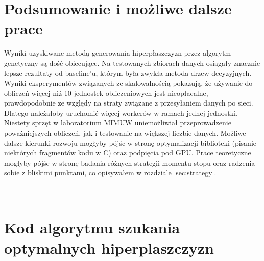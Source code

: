 \documentclass[magisterska]{pracamgr}
\theoremstyle{plain}
\theoremstyle{definition}
\theoremstyle{remark}
\begin{document}
\section{Podsumowanie i możliwe dalsze prace}
Wyniki uzyskiwane metodą generowania hiperpłaszczyzn przez algorytm genetyczny są dość obiecujące. 
Na testowanych zbiorach danych osiagały znacznie lepsze rezultaty od baseline'u, którym była zwykła metoda drzew decyzyjnych.
Wyniki eksperymentów związanych ze skalowalnością pokazują, że używanie do obliczeń więcej niż 10 jednostek obliczeniowych jest
nieopłacalne, prawdopodobnie ze względy na straty związane z przesyłaniem danych po sieci. Dlatego należałoby uruchomić więcej
workerów w ramach jednej jednostki. Niestety sprzęt w laboratorium MIMUW uniemożliwiał przeprowadzenie poważniejszych obliczeń,
jak i testowanie na większej liczbie danych.
Możliwe dalsze kierunki rozwoju mogłyby pójśc w stronę optymalizacji biblioteki (pisanie niektórych fragmentów kodu w C)
oraz podpięcia pod GPU. Prace teoretyczne mogłyby pójśc w stronę badania różnych strategii momentu stopu oraz radzenia sobie 
z bliskimi punktami, co opisywałem w rozdziale \ref{sec:strategy}.

\newpage
\appendix
\section{\\Kod algorytmu szukania optymalnych hiperplaszczyzn} \label{App:hyperp}
\end{document}
